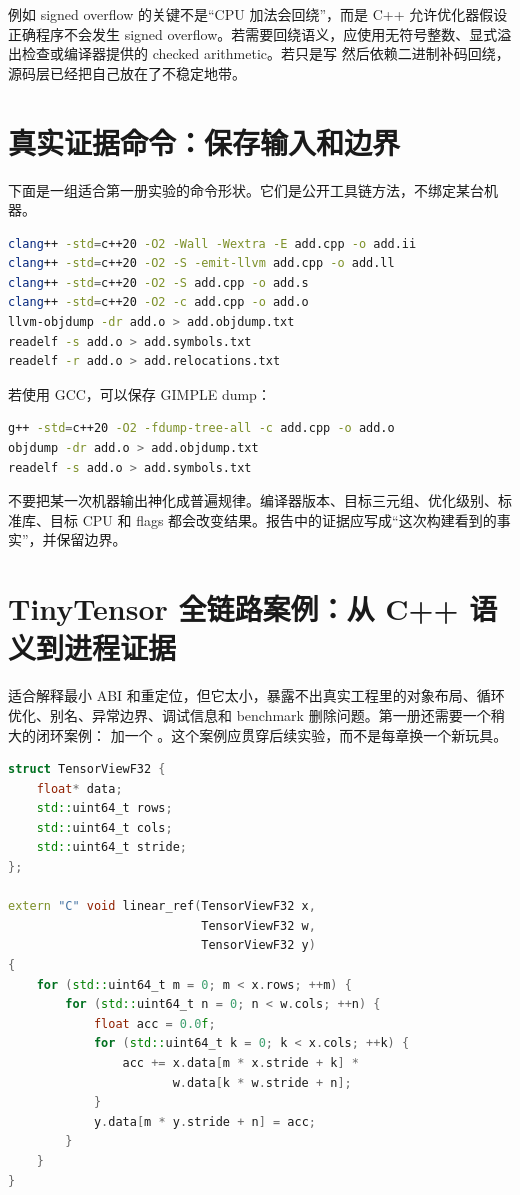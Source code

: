 例如 signed overflow 的关键不是“CPU 加法会回绕”，而是 C++ 允许优化器假设正确程序不会发生 signed overflow。若需要回绕语义，应使用无符号整数、显式溢出检查或编译器提供的 checked arithmetic。若只是写  然后依赖二进制补码回绕，源码层已经把自己放在了不稳定地带。

\section{真实证据命令：保存输入和边界}

下面是一组适合第一册实验的命令形状。它们是公开工具链方法，不绑定某台机器。

\begin{lstlisting}[language=bash,caption={保存预处理、IR、汇编和目标文件证据}]
clang++ -std=c++20 -O2 -Wall -Wextra -E add.cpp -o add.ii
clang++ -std=c++20 -O2 -S -emit-llvm add.cpp -o add.ll
clang++ -std=c++20 -O2 -S add.cpp -o add.s
clang++ -std=c++20 -O2 -c add.cpp -o add.o
llvm-objdump -dr add.o > add.objdump.txt
readelf -s add.o > add.symbols.txt
readelf -r add.o > add.relocations.txt
\end{lstlisting}

若使用 GCC，可以保存 GIMPLE dump：

\begin{lstlisting}[language=bash,caption={GCC/GIMPLE 证据形态}]
g++ -std=c++20 -O2 -fdump-tree-all -c add.cpp -o add.o
objdump -dr add.o > add.objdump.txt
readelf -s add.o > add.symbols.txt
\end{lstlisting}

不要把某一次机器输出神化成普遍规律。编译器版本、目标三元组、优化级别、标准库、目标 CPU 和 flags 都会改变结果。报告中的证据应写成“这次构建看到的事实”，并保留边界。

\section{TinyTensor 全链路案例：从 C++ 语义到进程证据}

 适合解释最小 ABI 和重定位，但它太小，暴露不出真实工程里的对象布局、循环优化、别名、异常边界、调试信息和 benchmark 删除问题。第一册还需要一个稍大的闭环案例： 加一个 。这个案例应贯穿后续实验，而不是每章换一个新玩具。

\begin{lstlisting}[language=C++,caption={TinyTensor 的最小源程序骨架}]
struct TensorViewF32 {
    float* data;
    std::uint64_t rows;
    std::uint64_t cols;
    std::uint64_t stride;
};

extern "C" void linear_ref(TensorViewF32 x,
                           TensorViewF32 w,
                           TensorViewF32 y)
{
    for (std::uint64_t m = 0; m < x.rows; ++m) {
        for (std::uint64_t n = 0; n < w.cols; ++n) {
            float acc = 0.0f;
            for (std::uint64_t k = 0; k < x.cols; ++k) {
                acc += x.data[m * x.stride + k] *
                       w.data[k * w.stride + n];
            }
            y.data[m * y.stride + n] = acc;
        }
    }
}
\end{lstlisting}

